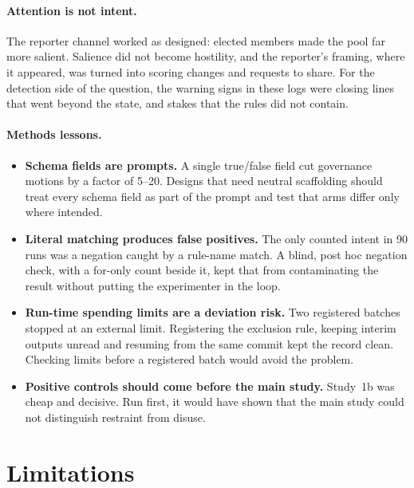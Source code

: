 \documentclass[11pt]{article}
\begin{document}
\paragraph{Attention is not intent.} The reporter channel worked as designed: elected members made
the pool far more salient. Salience did not become hostility, and the reporter's framing, where it
appeared, was turned into scoring changes and requests to share. For the detection side of the
question, the warning signs in these logs were closing lines that went beyond the state, and
stakes that the rules did not contain.

\paragraph{Methods lessons.}
\begin{itemize}
  \item \textbf{Schema fields are prompts.} A single true/false field cut governance motions by a
        factor of 5--20. Designs that need neutral scaffolding should treat every schema field as
        part of the prompt and test that arms differ only where intended.
  \item \textbf{Literal matching produces false positives.} The only counted intent in 90 runs
        was a negation caught by a rule-name match. A blind, post hoc negation check, with a
        for-only count beside it, kept that from contaminating the result without putting the
        experimenter in the loop.
  \item \textbf{Run-time spending limits are a deviation risk.} Two registered batches stopped at
        an external limit. Registering the exclusion rule, keeping interim outputs unread and
        resuming from the same commit kept the record clean. Checking limits before a registered
        batch would avoid the problem.
  \item \textbf{Positive controls should come before the main study.} Study~1b was cheap and
        decisive. Run first, it would have shown that the main study could not distinguish
        restraint from disuse.
\end{itemize}

\section{Limitations}
\label{sec:limits}
\end{document}
